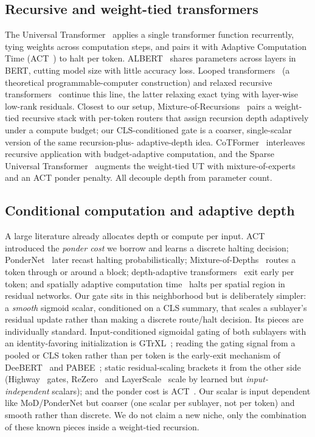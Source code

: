 \documentclass[conference]{IEEEtran}
\begin{document}
\subsection{Recursive and weight-tied transformers}
The Universal Transformer~\cite{ut} applies a single transformer function
recurrently, tying weights across computation steps, and pairs it with Adaptive
Computation Time (ACT~\cite{act}) to halt per token. ALBERT~\cite{albert} shares
parameters across layers in BERT, cutting model size with little accuracy loss.
Looped transformers~\cite{looped} (a theoretical programmable-computer construction)
and relaxed recursive transformers~\cite{relaxedrec} continue this line, the latter
relaxing exact tying with layer-wise low-rank residuals. Closest to our setup,
Mixture-of-Recursions~\cite{mor} pairs a weight-tied recursive stack with per-token
routers that assign recursion depth adaptively under a compute budget; our
CLS-conditioned gate is a coarser, single-scalar version of the same recursion-plus-
adaptive-depth idea. CoTFormer~\cite{cotformer} interleaves recursive application
with budget-adaptive computation, and the Sparse Universal Transformer~\cite{sut}
augments the weight-tied UT with mixture-of-experts and an ACT ponder penalty. All
decouple depth from parameter count.

\subsection{Conditional computation and adaptive depth}
A large literature already allocates depth or compute per input. ACT~\cite{act}
introduced the \emph{ponder cost} we borrow and learns a discrete halting decision;
PonderNet~\cite{pondernet} later recast halting probabilistically;
Mixture-of-Depths~\cite{mod} routes a token through or around a block;
depth-adaptive transformers~\cite{depthadaptive} exit early per token; and spatially
adaptive computation time~\cite{sact} halts per spatial region in residual networks.
Our gate sits in this neighborhood but is deliberately simpler: a \emph{smooth}
sigmoid scalar, conditioned on a CLS summary, that scales a sublayer's residual
update rather than making a discrete route/halt decision. Its pieces are
individually standard. Input-conditioned sigmoidal gating of both sublayers with an
identity-favoring initialization is GTrXL~\cite{gtrxl}; reading the gating signal
from a pooled or CLS token rather than per token is the early-exit mechanism of
DeeBERT~\cite{deebert} and PABEE~\cite{pabee}; static residual-scaling brackets it
from the other side (Highway~\cite{highway} gates, ReZero~\cite{rezero} and
LayerScale~\cite{layerscale} scale by learned but \emph{input-independent} scalars);
and the ponder cost is ACT~\cite{act}. Our scalar is input dependent like
MoD/PonderNet but coarser (one scalar per sublayer, not per token) and smooth rather
than discrete. We do not claim a new niche, only the combination of these known
pieces inside a weight-tied recursion.
\end{document}
